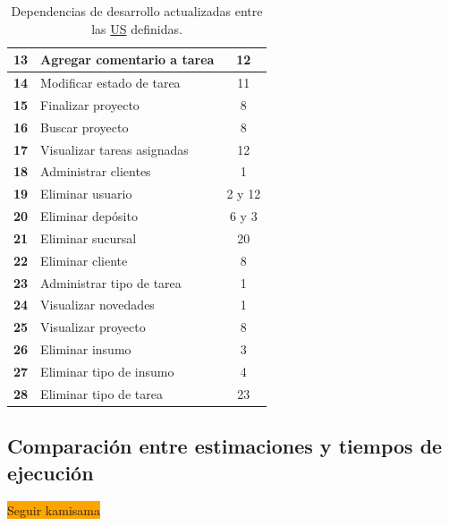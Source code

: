 \documentclass[a4paper, 12pt,twoside]{report}  %
\numberwithin{equation}{subsection} %
\begin{document}
\begin{table}[h!]
\begin{tabular}{ |p{0.5cm}|p{9cm}|c|  }
		\hline
		\textbf{13} & \cellcolor{marca_US_realizada_anterior}Agregar comentario a tarea & 12 \\
		\hline
		\textbf{14} & \cellcolor{marca_US_realizada_anterior}Modificar estado de tarea & 11 \\
		\hline
		\textbf{15} & \cellcolor{marca_US_realizada_anterior}Finalizar proyecto & 8 \\
		\hline
		\textbf{16} & \cellcolor{marca_US_realizada_anterior}Buscar proyecto & 8 \\
		\hline
		\textbf{17} & \cellcolor{marca_US_realizada_anterior}Visualizar tareas asignadas & 12 \\
		\hline
		\textbf{18} & \cellcolor{marca_US_realizada_anterior}Administrar clientes & 1 \\
		\hline
		\textbf{19} & \cellcolor{marca_US_realizada}Eliminar usuario & 2 y 12 \\
		\hline
		\textbf{20} & \cellcolor{marca_US_realizada}Eliminar depósito & 6 y 3 \\
		\hline
		\textbf{21} & \cellcolor{marca_US_realizada}Eliminar sucursal & 20 \\
		\hline
		\textbf{22} & \cellcolor{marca_US_realizada}Eliminar cliente & 8 \\
		\hline
		\textbf{23} & \cellcolor{marca_US_realizada_anterior}Administrar tipo de tarea & 1 
		\\
		\hline
		\textbf{24} & \cellcolor{marca_US_realizada_anterior}Visualizar novedades & 1 
		\\
		\hline
		\textbf{25} & \cellcolor{marca_US_realizada_anterior}Visualizar proyecto & 8 
		\\
		\hline
		\textbf{26} & \cellcolor{marca_US_realizada}Eliminar insumo & 3 
		\\
		\hline
		\textbf{27} & \cellcolor{marca_US_realizada}Eliminar tipo de insumo & 4 
		\\
		\hline
		\textbf{28} & \cellcolor{marca_US_realizada}Eliminar tipo de tarea & 23 
		\\
		\hline
	\end{tabular}
	\caption{Dependencias de desarrollo actualizadas entre las \protect\hyperlink{US}{US} definidas.}
	\label{tabla_dependencias_us_it5}
\end{table}

\subsection{Comparación entre estimaciones y tiempos de ejecución}
\colorbox{orange}{Seguir kamisama}
\end{document}
